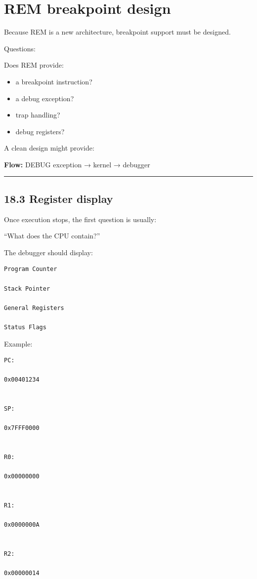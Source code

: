 \documentclass[
  oneside,
  openany]{book}
\providecommand{\tightlist}{%
  \setlength{\itemsep}{0pt}\setlength{\parskip}{0pt}}
\begin{document}
\hypertarget{rem-breakpoint-design}{%
\chapter{REM breakpoint design}\label{rem-breakpoint-design}}

Because REM is a new architecture, breakpoint support must be designed.

Questions:

Does REM provide:

\begin{itemize}
\tightlist
\item
  a breakpoint instruction?
\item
  a debug exception?
\item
  trap handling?
\item
  debug registers?
\end{itemize}

A clean design might provide:

\textbf{Flow:} DEBUG exception → kernel → debugger

\begin{center}\rule{0.5\linewidth}{0.5pt}\end{center}

\hypertarget{register-display}{%
\section{18.3 Register display}\label{register-display}}

Once execution stops, the first question is usually:

``What does the CPU contain?''

The debugger should display:

\begin{verbatim}
Program Counter

Stack Pointer

General Registers

Status Flags
\end{verbatim}

Example:

\begin{verbatim}
PC:

0x00401234


SP:

0x7FFF0000


R0:

0x00000000


R1:

0x0000000A


R2:

0x00000014
\end{verbatim}
\end{document}
